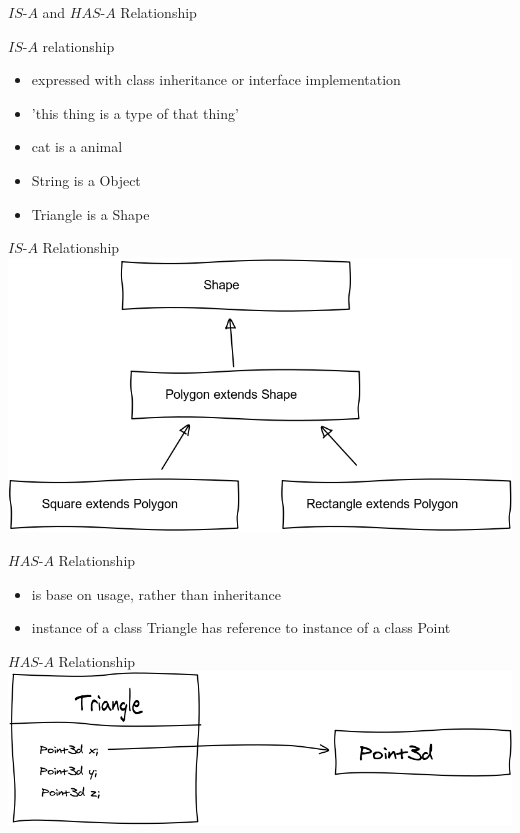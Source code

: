 \documentclass[a4paper, 11pt]{beamer}
\begin{document}
\begin{frame}
\begin{centering}
\huge $\textit{IS-A}$ and $\textit{HAS-A}$ Relationship
\end{centering}
\end{frame}



\begin{frame}{$\textit{IS-A}$ relationship}
\begin{itemize}
\item expressed with class inheritance or interface implementation
\item 'this thing is a type of that thing'
\item cat is a animal
\item String is a Object
\item Triangle is a Shape
\end{itemize}
\end{frame}



\begin{frame}{$\textit{IS-A}$ Relationship}
\centering
\includegraphics[scale=0.3]{img/isa.png}
\end{frame} 

\begin{frame}{$\textit{HAS-A}$ Relationship}
\begin{itemize}
\item is base on usage, rather than inheritance
\item instance of a class Triangle has reference to instance of a class Point
\end{itemize}
\end{frame}

\begin{frame}{$\textit{HAS-A}$ Relationship}
\centering
\includegraphics[scale=0.3]{img/hasa.png}
\end{frame}
\end{document}
